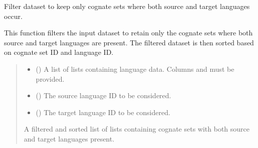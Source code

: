 \documentclass[letterpaper,10pt,english]{sphinxmanual}
\begin{document}
\begin{fulllineitems}
\label{\detokenize{documentation:loanpy.utils.prefilter}}
\pysigstartsignatures
{}
\pysigstopsignatures
\sphinxAtStartPar
Filter dataset to keep only cognate sets where both source and target languages
occur.

\sphinxAtStartPar
This function filters the input dataset to retain only the cognate sets where
both source and target languages are present. The filtered dataset is then
sorted based on cognate set ID and language ID.
\begin{quote}\begin{description}
\begin{itemize}
\item {} 
\sphinxAtStartPar
{} () \textendash{} A list of lists containing language data. Columns
 and  must be provided.

\item {} 
\sphinxAtStartPar
{} () \textendash{} The source language ID to be considered.

\item {} 
\sphinxAtStartPar
{} () \textendash{} The target language ID to be considered.

\end{itemize}

\sphinxAtStartPar
A filtered and sorted list of lists containing cognate sets with both
source and target languages present.


\end{description}
\end{quote}
\end{fulllineitems}
\end{document}
